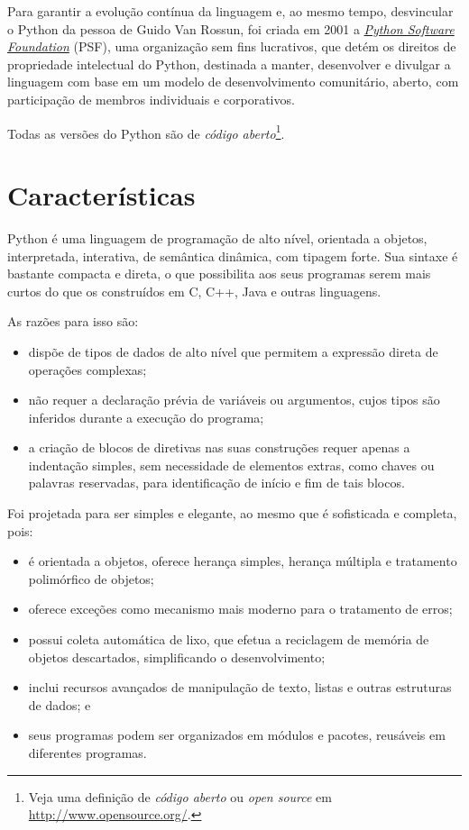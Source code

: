 \documentclass[
]{book}
\providecommand{\tightlist}{%
  \setlength{\itemsep}{0pt}\setlength{\parskip}{0pt}}
\begin{document}
Para garantir a evolução contínua da linguagem e, ao mesmo tempo, desvincular o Python da pessoa de Guido Van Rossun, foi criada em 2001 a \href{https://www.python.org/psf/}{\emph{Python Software Foundation}} (PSF), uma organização sem fins lucrativos, que detém os direitos de propriedade intelectual do Python, destinada a manter, desenvolver e divulgar a linguagem com base em um modelo de desenvolvimento comunitário, aberto, com participação de membros individuais e corporativos.

Todas as versões do Python são de \emph{código aberto}\footnote{Veja uma definição de \emph{código aberto} ou \emph{open source} em \url{http://www.opensource.org/}.}.

\hypertarget{introd-carac}{%
\section{Características}\label{introd-carac}}

Python é uma linguagem de programação de alto nível, orientada a objetos, interpretada, interativa, de semântica dinâmica, com tipagem forte. Sua sintaxe é bastante compacta e direta, o que possibilita aos seus programas serem mais curtos do que os construídos em C, C++, Java e outras linguagens.

As razões para isso são:

\begin{itemize}
\tightlist
\item
  dispõe de tipos de dados de alto nível que permitem a expressão direta de operações complexas;
\item
  não requer a declaração prévia de variáveis ou argumentos, cujos tipos são inferidos durante a execução do programa;
\item
  a criação de blocos de diretivas nas suas construções requer apenas a indentação simples, sem necessidade de elementos extras, como chaves ou palavras reservadas, para identificação de início e fim de tais blocos.
\end{itemize}

Foi projetada para ser simples e elegante, ao mesmo que é sofisticada e completa, pois:

\begin{itemize}
\tightlist
\item
  é orientada a objetos, oferece herança simples, herança múltipla e tratamento polimórfico de objetos;
\item
  oferece exceções como mecanismo mais moderno para o tratamento de erros;
\item
  possui coleta automática de lixo, que efetua a reciclagem de memória de objetos descartados, simplificando o desenvolvimento;
\item
  inclui recursos avançados de manipulação de texto, listas e outras estruturas de dados; e
\item
  seus programas podem ser organizados em módulos e pacotes, reusáveis em diferentes programas.
\end{itemize}
\end{document}
